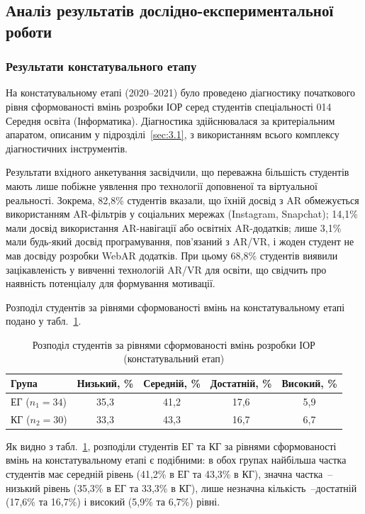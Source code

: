 \subsection{Аналіз результатів дослідно-експериментальної роботи}\label{sec:3.3}

\subsubsection{Результати констатувального етапу}

На констатувальному етапі (2020--2021) було проведено діагностику початкового рівня сформованості вмінь розробки ІОР серед студентів спеціальності 014 Середня освіта (Інформатика). Діагностика здійснювалася за критеріальним апаратом, описаним у підрозділі~\ref{sec:3.1}, з використанням всього комплексу діагностичних інструментів.

Результати вхідного анкетування засвідчили, що переважна більшість студентів мають лише побіжне уявлення про технології доповненої та віртуальної реальності. Зокрема, 82,8\% студентів вказали, що їхній досвід з AR обмежується використанням AR-фільтрів у соціальних мережах (Instagram, Snapchat); 14,1\% мали досвід використання AR-навігації або освітніх AR-додатків; лише 3,1\% мали будь-який досвід програмування, пов'язаний з AR/VR, і жоден студент не мав досвіду розробки WebAR додатків. При цьому 68,8\% студентів виявили зацікавленість у вивченні технологій AR/VR для освіти, що свідчить про наявність потенціалу для формування мотивації.

Розподіл студентів за рівнями сформованості вмінь на констатувальному етапі подано у табл.~\ref{tab:konst}.

\begin{table}[!h]
\caption{Розподіл студентів за рівнями сформованості вмінь розробки ІОР (констатувальний етап)}
\label{tab:konst}
\centering
\begin{tabular}{|l|c|c|c|c|}
\hline
\textbf{Група} & \textbf{Низький, \%} & \textbf{Середній, \%} & \textbf{Достатній, \%} & \textbf{Високий, \%} \\
\hline
ЕГ ($n_1 = 34$) & 35,3 & 41,2 & 17,6 & 5,9 \\
\hline
КГ ($n_2 = 30$) & 33,3 & 43,3 & 16,7 & 6,7 \\
\hline
\end{tabular}
\end{table}

Як видно з табл.~\ref{tab:konst}, розподіли студентів ЕГ та КГ за рівнями сформованості вмінь на констатувальному етапі є подібними: в обох групах найбільша частка студентів має середній рівень (41,2\% в ЕГ та 43,3\% в КГ), значна частка~--низький рівень (35,3\% в ЕГ та 33,3\% в КГ), лише незначна кількість~--достатній (17,6\% та 16,7\%) і високий (5,9\% та 6,7\%) рівні.

